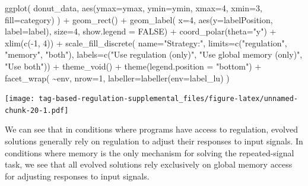 \documentclass[
]{book}
\newenvironment{Shaded}{\begin{snugshade}}{\end{snugshade}}
\newcommand{\AttributeTok}[1]{\textcolor[rgb]{0.77,0.63,0.00}{#1}}
\newcommand{\ConstantTok}[1]{\textcolor[rgb]{0.00,0.00,0.00}{#1}}
\newcommand{\DecValTok}[1]{\textcolor[rgb]{0.00,0.00,0.81}{#1}}
\newcommand{\FunctionTok}[1]{\textcolor[rgb]{0.00,0.00,0.00}{#1}}
\newcommand{\NormalTok}[1]{#1}
\newcommand{\SpecialCharTok}[1]{\textcolor[rgb]{0.00,0.00,0.00}{#1}}
\newcommand{\StringTok}[1]{\textcolor[rgb]{0.31,0.60,0.02}{#1}}
\begin{document}
\begin{Shaded}
\begin{Highlighting}[]
\FunctionTok{ggplot}\NormalTok{( donut\_data, }\FunctionTok{aes}\NormalTok{(}\AttributeTok{ymax=}\NormalTok{ymax, }\AttributeTok{ymin=}\NormalTok{ymin, }\AttributeTok{xmax=}\DecValTok{4}\NormalTok{, }\AttributeTok{xmin=}\DecValTok{3}\NormalTok{, }\AttributeTok{fill=}\NormalTok{category) ) }\SpecialCharTok{+}
  \FunctionTok{geom\_rect}\NormalTok{() }\SpecialCharTok{+}
  \FunctionTok{geom\_label}\NormalTok{( }\AttributeTok{x=}\DecValTok{4}\NormalTok{, }\FunctionTok{aes}\NormalTok{(}\AttributeTok{y=}\NormalTok{labelPosition, }\AttributeTok{label=}\NormalTok{label), }\AttributeTok{size=}\DecValTok{4}\NormalTok{, }\AttributeTok{show.legend =} \ConstantTok{FALSE}\NormalTok{) }\SpecialCharTok{+}
  \FunctionTok{coord\_polar}\NormalTok{(}\AttributeTok{theta=}\StringTok{"y"}\NormalTok{) }\SpecialCharTok{+}
  \FunctionTok{xlim}\NormalTok{(}\FunctionTok{c}\NormalTok{(}\SpecialCharTok{{-}}\DecValTok{1}\NormalTok{, }\DecValTok{4}\NormalTok{)) }\SpecialCharTok{+}
  \FunctionTok{scale\_fill\_discrete}\NormalTok{(}
    \AttributeTok{name=}\StringTok{"Strategy:"}\NormalTok{,}
    \AttributeTok{limits=}\FunctionTok{c}\NormalTok{(}\StringTok{"regulation"}\NormalTok{,}
             \StringTok{"memory"}\NormalTok{,}
             \StringTok{"both"}\NormalTok{),}
    \AttributeTok{labels=}\FunctionTok{c}\NormalTok{(}\StringTok{"Use regulation (only)"}\NormalTok{,}
             \StringTok{"Use global memory (only)"}\NormalTok{,}
             \StringTok{"Use both"}\NormalTok{)) }\SpecialCharTok{+}
  \FunctionTok{theme\_void}\NormalTok{() }\SpecialCharTok{+}
  \FunctionTok{theme}\NormalTok{(}\AttributeTok{legend.position =} \StringTok{"bottom"}\NormalTok{) }\SpecialCharTok{+}
  \FunctionTok{facet\_wrap}\NormalTok{(}
    \SpecialCharTok{\textasciitilde{}}\NormalTok{env,}
    \AttributeTok{nrow=}\DecValTok{1}\NormalTok{,}
    \AttributeTok{labeller=}\FunctionTok{labeller}\NormalTok{(}\AttributeTok{env=}\NormalTok{label\_lu)}
\NormalTok{  )}
\end{Highlighting}
\end{Shaded}

\texttt{[image: tag-based-regulation-supplemental\_files/figure-latex/unnamed-chunk-20-1.pdf]}

We can see that in conditions where programs have access to regulation, evolved solutions generally rely on regulation to adjust their responses to input signals.
In conditions where memory is the only mechanism for solving the repeated-signal task, we see that all evolved solutions rely exclusively on global memory access for adjusting responses to input signals.
\end{document}
